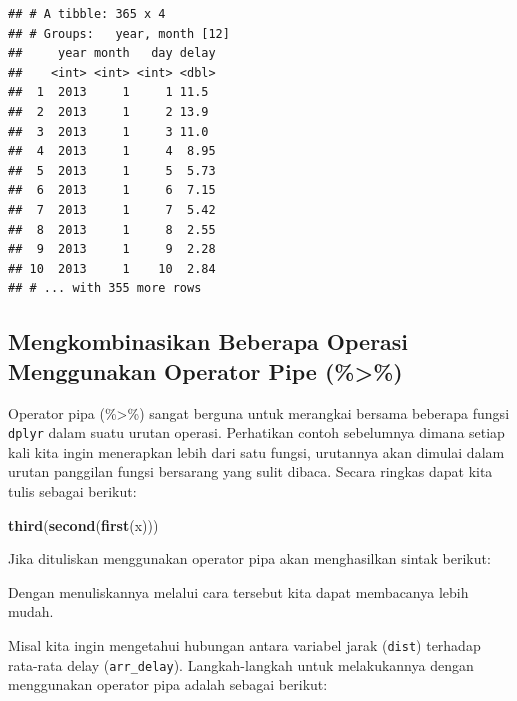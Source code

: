 \documentclass[]{book}
\newenvironment{Shaded}{\begin{snugshade}}{\end{snugshade}}
\newcommand{\KeywordTok}[1]{\textcolor[rgb]{0.13,0.29,0.53}{\textbf{#1}}}
\newcommand{\StringTok}[1]{\textcolor[rgb]{0.31,0.60,0.02}{#1}}
\newcommand{\OperatorTok}[1]{\textcolor[rgb]{0.81,0.36,0.00}{\textbf{#1}}}
\newcommand{\NormalTok}[1]{#1}
\begin{document}
\begin{verbatim}
## # A tibble: 365 x 4
## # Groups:   year, month [12]
##     year month   day delay
##    <int> <int> <int> <dbl>
##  1  2013     1     1 11.5 
##  2  2013     1     2 13.9 
##  3  2013     1     3 11.0 
##  4  2013     1     4  8.95
##  5  2013     1     5  5.73
##  6  2013     1     6  7.15
##  7  2013     1     7  5.42
##  8  2013     1     8  2.55
##  9  2013     1     9  2.28
## 10  2013     1    10  2.84
## # ... with 355 more rows
\end{verbatim}

\subsection{Mengkombinasikan Beberapa Operasi Menggunakan Operator Pipe
(\%\textgreater{}\%)}\label{mengkombinasikan-beberapa-operasi-menggunakan-operator-pipe}

Operator pipa (\%\textgreater{}\%) sangat berguna untuk merangkai
bersama beberapa fungsi \texttt{dplyr} dalam suatu urutan operasi.
Perhatikan contoh sebelumnya dimana setiap kali kita ingin menerapkan
lebih dari satu fungsi, urutannya akan dimulai dalam urutan panggilan
fungsi bersarang yang sulit dibaca. Secara ringkas dapat kita tulis
sebagai berikut:

\begin{Shaded}
\begin{Highlighting}[]
\KeywordTok{third}\NormalTok{(}\KeywordTok{second}\NormalTok{(}\KeywordTok{first}\NormalTok{(x)))}
\end{Highlighting}
\end{Shaded}

Jika dituliskan menggunakan operator pipa akan menghasilkan sintak
berikut:

\begin{Shaded}
\end{Shaded}

Dengan menuliskannya melalui cara tersebut kita dapat membacanya lebih
mudah.

Misal kita ingin mengetahui hubungan antara variabel jarak
(\texttt{dist}) terhadap rata-rata delay (\texttt{arr\_delay}).
Langkah-langkah untuk melakukannya dengan menggunakan operator pipa
adalah sebagai berikut:
\end{document}
